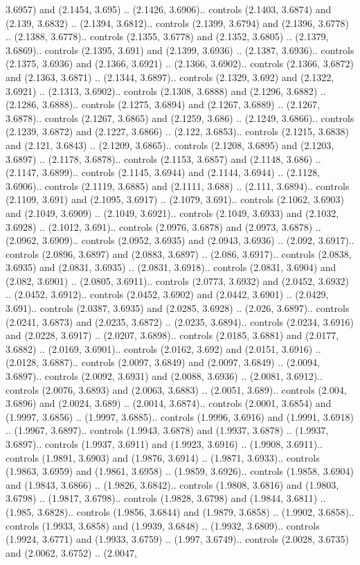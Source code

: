 3.6957) and (2.1454, 3.695) .. (2.1426, 3.6906).. controls (2.1403, 3.6874) and (2.139, 3.6832) .. (2.1394, 3.6812).. controls (2.1399, 3.6794) and (2.1396, 3.6778) .. (2.1388, 3.6778).. controls (2.1355, 3.6778) and (2.1352, 3.6805) .. (2.1379, 3.6869).. controls (2.1395, 3.691) and (2.1399, 3.6936) .. (2.1387, 3.6936).. controls (2.1375, 3.6936) and (2.1366, 3.6921) .. (2.1366, 3.6902).. controls (2.1366, 3.6872) and (2.1363, 3.6871) .. (2.1344, 3.6897).. controls (2.1329, 3.692) and (2.1322, 3.6921) .. (2.1313, 3.6902).. controls (2.1308, 3.6888) and (2.1296, 3.6882) .. (2.1286, 3.6888).. controls (2.1275, 3.6894) and (2.1267, 3.6889) .. (2.1267, 3.6878).. controls (2.1267, 3.6865) and (2.1259, 3.686) .. (2.1249, 3.6866).. controls (2.1239, 3.6872) and (2.1227, 3.6866) .. (2.122, 3.6853).. controls (2.1215, 3.6838) and (2.121, 3.6843) .. (2.1209, 3.6865).. controls (2.1208, 3.6895) and (2.1203, 3.6897) .. (2.1178, 3.6878).. controls (2.1153, 3.6857) and (2.1148, 3.686) .. (2.1147, 3.6899).. controls (2.1145, 3.6944) and (2.1144, 3.6944) .. (2.1128, 3.6906).. controls (2.1119, 3.6885) and (2.1111, 3.688) .. (2.111, 3.6894).. controls (2.1109, 3.691) and (2.1095, 3.6917) .. (2.1079, 3.691).. controls (2.1062, 3.6903) and (2.1049, 3.6909) .. (2.1049, 3.6921).. controls (2.1049, 3.6933) and (2.1032, 3.6928) .. (2.1012, 3.691).. controls (2.0976, 3.6878) and (2.0973, 3.6878) .. (2.0962, 3.6909).. controls (2.0952, 3.6935) and (2.0943, 3.6936) .. (2.092, 3.6917).. controls (2.0896, 3.6897) and (2.0883, 3.6897) .. (2.086, 3.6917).. controls (2.0838, 3.6935) and (2.0831, 3.6935) .. (2.0831, 3.6918).. controls (2.0831, 3.6904) and (2.082, 3.6901) .. (2.0805, 3.6911).. controls (2.0773, 3.6932) and (2.0452, 3.6932) .. (2.0452, 3.6912).. controls (2.0452, 3.6902) and (2.0442, 3.6901) .. (2.0429, 3.691).. controls (2.0387, 3.6935) and (2.0285, 3.6928) .. (2.026, 3.6897).. controls (2.0241, 3.6873) and (2.0235, 3.6872) .. (2.0235, 3.6894).. controls (2.0234, 3.6916) and (2.0228, 3.6917) .. (2.0207, 3.6898).. controls (2.0185, 3.6881) and (2.0177, 3.6882) .. (2.0169, 3.6901).. controls (2.0162, 3.692) and (2.0151, 3.6916) .. (2.0128, 3.6887).. controls (2.0097, 3.6849) and (2.0097, 3.6849) .. (2.0094, 3.6897).. controls (2.0092, 3.6931) and (2.0088, 3.6936) .. (2.0081, 3.6912).. controls (2.0076, 3.6893) and (2.0063, 3.6883) .. (2.0051, 3.689).. controls (2.004, 3.6896) and (2.0024, 3.689) .. (2.0014, 3.6874).. controls (2.0001, 3.6854) and (1.9997, 3.6856) .. (1.9997, 3.6885).. controls (1.9996, 3.6916) and (1.9991, 3.6918) .. (1.9967, 3.6897).. controls (1.9943, 3.6878) and (1.9937, 3.6878) .. (1.9937, 3.6897).. controls (1.9937, 3.6911) and (1.9923, 3.6916) .. (1.9908, 3.6911).. controls (1.9891, 3.6903) and (1.9876, 3.6914) .. (1.9871, 3.6933).. controls (1.9863, 3.6959) and (1.9861, 3.6958) .. (1.9859, 3.6926).. controls (1.9858, 3.6904) and (1.9843, 3.6866) .. (1.9826, 3.6842).. controls (1.9808, 3.6816) and (1.9803, 3.6798) .. (1.9817, 3.6798).. controls (1.9828, 3.6798) and (1.9844, 3.6811) .. (1.985, 3.6828).. controls (1.9856, 3.6844) and (1.9879, 3.6858) .. (1.9902, 3.6858).. controls (1.9933, 3.6858) and (1.9939, 3.6848) .. (1.9932, 3.6809).. controls (1.9924, 3.6771) and (1.9933, 3.6759) .. (1.997, 3.6749).. controls (2.0028, 3.6735) and (2.0062, 3.6752) .. (2.0047, 